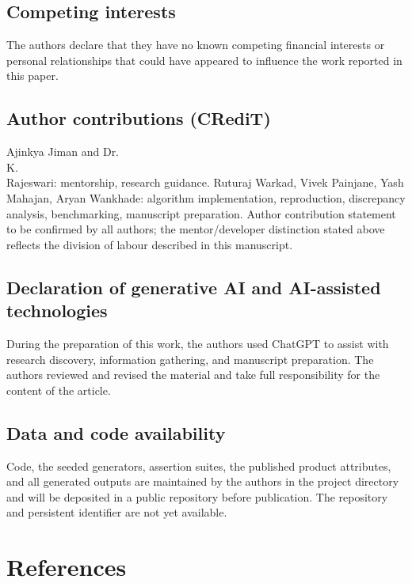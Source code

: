 \documentclass[twocolumn,a4paper]{elsarticle}
\begin{document}
\subsection{Competing interests}
The authors declare that they have no known competing financial interests or personal relationships that could have appeared to influence the work reported in this paper.

\subsection{Author contributions (CRediT)}
Ajinkya Jiman and Dr.\\ K.\\ Rajeswari: mentorship, research guidance. Ruturaj Warkad, Vivek Painjane, Yash Mahajan, Aryan Wankhade: algorithm implementation, reproduction, discrepancy analysis, benchmarking, manuscript preparation. Author contribution statement to be confirmed by all authors; the mentor/developer distinction stated above reflects the division of labour described in this manuscript.

\subsection{Declaration of generative AI and AI-assisted technologies}
During the preparation of this work, the authors used ChatGPT to assist with research discovery, information gathering, and manuscript preparation. The authors reviewed and revised the material and take full responsibility for the content of the article.

\subsection{Data and code availability}
Code, the seeded generators, assertion suites, the published product attributes, and all generated outputs are maintained by the authors in the project directory and will be deposited in a public repository before publication. The repository and persistent identifier are not yet available.

\section*{References}



\end{document}
